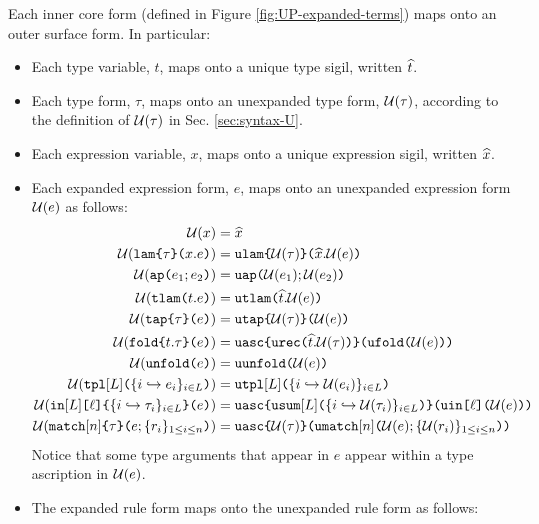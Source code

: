 Each inner core form (defined in Figure \ref{fig:UP-expanded-terms}) maps onto an outer surface form. In particular:
\begin{itemize}
\item Each type variable, $t$, maps onto a unique {type sigil}, written $\sigilof{t}$. %
\item Each type form, $\tau$, maps onto an unexpanded type form, $\Uof{\tau}$, according to the definition of $\Uof{\tau}$ in Sec. \ref{sec:syntax-U}.
\item Each expression variable, $x$, maps onto a unique expression sigil, written $\sigilof{x}$. %
\item Each expanded expression form, $e$, maps onto an unexpanded expression form $\Uof{e}$ as follows:
\begin{align*}
\Uof{x} & = \sigilof{x}\\
\Uof{\aelam{\tau}{x}{e}} & = \aulam{\Uof{\tau}}{\sigilof{x}}{\Uof{e}}\\
\Uof{\aeap{e_1}{e_2}} & = \auap{\Uof{e_1}}{\Uof{e_2}}\\
\Uof{\aetlam{t}{e}} & = \autlam{\sigilof{t}}{\Uof{e}}\\
\Uof{\aetap{e}{\tau}} & = \autap{\Uof{e}}{\Uof{\tau}}\\
\Uof{\aefold{t}{\tau}{e}} & = \auasc{\aurec{\sigilof{t}}{\Uof{\tau}}}{\auanafold{\Uof e}}\\
\Uof{\aeunfold{e}} & = \auunfold{\Uof{e}}\\
\Uof{\aetpl{\labelset}{\mapschema{e}{i}{\labelset}}} & = \autpl{\labelset}{\mapschemax{\Uofv}{e}{i}{\labelset}}\\
\Uof{\aein{\labelset}{\ell}{\mapschema{\tau}{i}{\labelset}}{e}} &= \auasc{\ausum{\labelset}{\mapschemax{\Uofv}{\tau}{i}{\labelset}}}{\auanain{\ell}{\Uof{e}}}\\
\Uof{\aematchwith{n}{\tau}{e}{\seqschemaX{r}}} &= \auasc{{\Uof{\tau}}}{\aumatchwithb{n}{\Uof{e}}{\seqschemaXx{\Uofv}{r}}}\\
\end{align*}
Notice that some type arguments that appear in $e$ appear within a type ascription in $\Uof{e}$. 
\item The expanded rule form maps onto the unexpanded rule form as follows:

\end{itemize}
